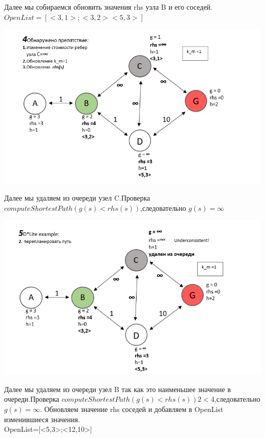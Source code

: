 \documentclass[12pt]{article}
\begin{document}
Далее мы собираемся обновить значения rhs узла B  и его соседей.\\$OpenList=[<3,1>;<3,2><5,3>]$
\begin{center}
         \includegraphics[width=1\textwidth]{img/example4_1.png}
    \end{center}
Далее мы удаляем из очереди узел C.Проверка $computeShortestPath(g(s)<rhs(s))$,следовательно $g(s)=\infty$
\begin{center}
         \includegraphics[width=1\textwidth]{img/example5.png}
    \end{center}
Далее мы удаляем из очереди узел B так как это наименьшее значение в очереди.Проверка 
$computeShortestPath(g(s)<rhs(s)) 2 < 4$,следовательно $g(s)=\infty$. Обновляем значение rhs  соседей и добавляем в OpenList изменившиеся значения.\\OpenList=[<5,3>;<12,10>]
\end{document}
